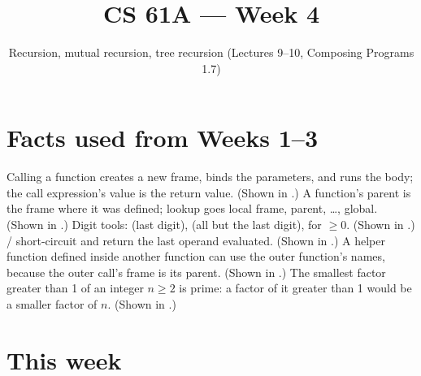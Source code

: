 \documentclass[10pt]{scrartcl}
\title{CS 61A --- Week 4}
\subtitle{Recursion, mutual recursion, tree recursion (Lectures 9--10, Composing Programs 1.7)}
\author{}\date{}\ihead{}
\begin{document}
\maketitle

\section{Facts used from Weeks 1--3}
\begin{enumerate}[label=(W\arabic*),leftmargin=2.8em,itemsep=4pt]
  \ii {}Calling a function creates a new frame, binds the parameters, and runs the body; the call expression's value is the return value. (Shown in .)
  \ii {}A function's parent is the frame where it was defined; lookup goes local frame, parent, \dots, global. (Shown in .)
  \ii {}Digit tools:  (last digit),  (all but the last digit), for  $\ge 0$. (Shown in .)
  \ii {}/ short-circuit and return the last operand evaluated. (Shown in .)
  \ii {}A helper function defined inside another function can use the outer function's names, because the outer call's frame is its parent. (Shown in .)
  \ii {}The smallest factor greater than 1 of an integer $n\ge2$ is prime: a factor of it greater than 1 would be a smaller factor of $n$. (Shown in .)
\end{enumerate}

\section{This week}
\end{document}
